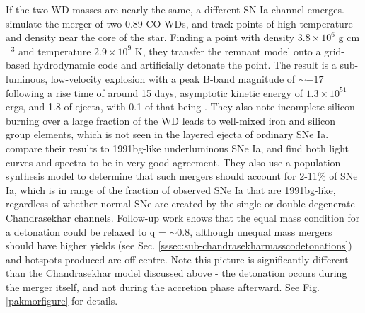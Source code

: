 If the two WD masses are nearly the same, a different SN Ia channel emerges.  \cite{pakm+10} simulate the merger of two 0.89 CO WDs, and track points of high temperature and density near the core of the star.  Finding a point with density $3.8 \times 10^6$ g cm$^{-3}$ and temperature $2.9 \times 10^9$ K, they transfer the remnant model onto a grid-based hydrodynamic code and artificially detonate the point.  The result is a sub-luminous, low-velocity explosion with a peak B-band magnitude of $\sim -17$ following  a rise time of around 15 days, asymptotic kinetic energy of $1.3 \times 10^{51}$ ergs, and 1.8 {\Msun} of ejecta, with 0.1 {\Msun} of that being \Ni.  They also note incomplete silicon burning over a large fraction of the WD leads to well-mixed iron and silicon group elements, which is not seen in the layered ejecta of ordinary SNe Ia.  \citeauthor{pakm+10} compare their results to 1991bg-like underluminous SNe Ia, and find both light curves and spectra to be in very good agreement.  They also use a population synthesis model to determine that such mergers should account for 2-11\% of SNe Ia, which is in range of the fraction of observed SNe Ia that are 1991bg-like, regardless of whether normal SNe are created by the single or double-degenerate Chandrasekhar channels.  Follow-up work \citep{pakm+11} shows that the equal mass condition for a detonation could be relaxed to q = $\sim$0.8, although unequal mass mergers should have higher {\Ni} yields (see Sec. \ref{sssec:sub-chandrasekharmasscodetonations}) and hotspots produced are off-centre.  Note this picture is significantly different than the Chandrasekhar model discussed above - the detonation occurs during the merger itself, and not during the accretion phase afterward.  See Fig. \ref{pakmorfigure} for details.


